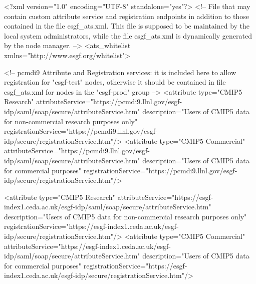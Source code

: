 \begin{tiny}
\begin{verbatimtab}[4]
<?xml version="1.0" encoding="UTF-8" standalone="yes"?>
<!-- File that may contain custom attribute service and registration endpoints 
     in addition to those contained in the file esgf_ats.xml. 
     This file is supposed to be maintained by the local system administrators,
     while the file esgf_ats.xml is dynamically generated by the node manager. -->
<ats_whitelist xmlns="http://www.esgf.org/whitelist">

	<!-- pcmdi9 Attribute and Registration services: it is included here to allow registration for "esgf-test" nodes,
	     otherwise it should be contained in file esgf_ats.xml for nodes in the "esgf-prod" group -->
	<attribute type="CMIP5 Research"
               attributeService="https://pcmdi9.llnl.gov/esgf-idp/saml/soap/secure/attributeService.htm"
               description="Users of CMIP5 data for non-commercial research purposes only"
               registrationService="https://pcmdi9.llnl.gov/esgf-idp/secure/registrationService.htm"/>
    <attribute type="CMIP5 Commercial"
               attributeService="https://pcmdi9.llnl.gov/esgf-idp/saml/soap/secure/attributeService.htm"
               description="Users of CMIP5 data for commercial purposes"
               registrationService="https://pcmdi9.llnl.gov/esgf-idp/secure/registrationService.htm"/>

	<attribute type="CMIP5 Research"
             attributeService="https://esgf-index1.ceda.ac.uk/esgf-idp/saml/soap/secure/attributeService.htm"
             description="Users of CMIP5 data for non-commercial research purposes only"
             registrationService="https://esgf-index1.ceda.ac.uk/esgf-idp/secure/registrationService.htm"/>
   <attribute type="CMIP5 Commercial"
             attributeService="https://esgf-index1.ceda.ac.uk/esgf-idp/saml/soap/secure/attributeService.htm"
             description="Users of CMIP5 data for commercial purposes"
             registrationService="https://esgf-index1.ceda.ac.uk/esgf-idp/secure/registrationService.htm"/>
               

\end{verbatimtab}
\end{tiny}
